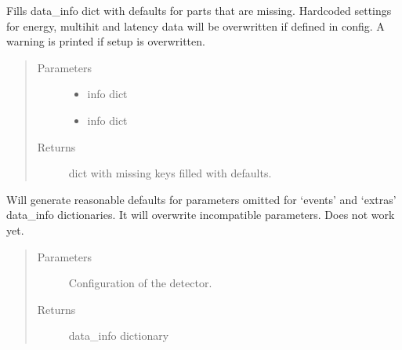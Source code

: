 \documentclass[letterpaper,10pt,english]{sphinxmanual}
\begin{document}
\begin{fulllineitems}
\label{\detokenize{autodocs/data:listmode.data.data_info}}
\sphinxAtStartPar
Fills data\_info dict with defaults for parts that are missing. Hardcoded settings for energy, multihit and latency
data will be overwritten if defined in config. A warning is printed if setup is overwritten.
\begin{quote}\begin{description}
\item[{Parameters}] \leavevmode\begin{itemize}
\item {} 
\sphinxAtStartPar
{} \textendash{} info dict

\item {} 
\sphinxAtStartPar
{} \textendash{} info dict

\end{itemize}

\item[{Returns}] \leavevmode
\sphinxAtStartPar
dict with missing keys filled with defaults.

\end{description}\end{quote}

\end{fulllineitems}


\begin{fulllineitems}
\label{\detokenize{autodocs/data:listmode.data.fill_default_data}}
\sphinxAtStartPar
Will generate reasonable defaults for parameters omitted for ‘events’ and ‘extras’ data\_info dictionaries. It will
overwrite incompatible parameters. Does not work yet.
\begin{quote}\begin{description}
\item[{Parameters}] \leavevmode
\sphinxAtStartPar
{} \textendash{} Configuration of the detector.

\item[{Returns}] \leavevmode
\sphinxAtStartPar
data\_info dictionary

\end{description}\end{quote}

\end{fulllineitems}
\end{document}
